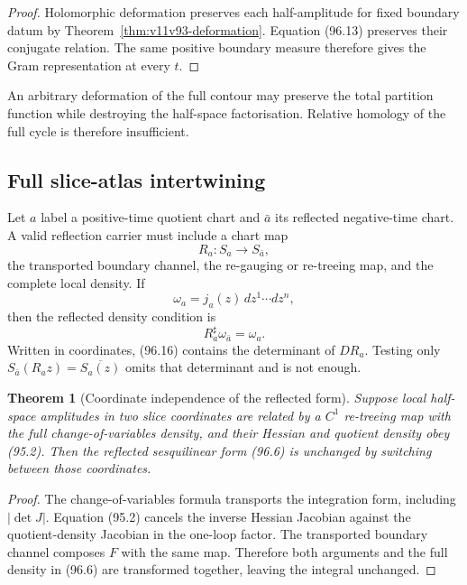 \documentclass[11pt]{article}
\newtheorem{theorem}{Theorem}[section]
\begin{document}
\begin{proof}
Holomorphic deformation preserves each half-amplitude for fixed
boundary datum by Theorem~\ref{thm:v11v93-deformation}.
Equation (96.13) preserves their conjugate relation.  The same
positive boundary measure therefore gives the Gram representation at
every \(t\).
\end{proof}

An arbitrary deformation of the full contour may preserve the total
partition function while destroying the half-space factorisation.
Relative homology of the full cycle is therefore insufficient.

\subsection{Full slice-atlas intertwining}

Let \(a\) label a positive-time quotient chart and
\(\bar a\) its reflected negative-time chart.  A valid reflection
carrier must include a chart map
\[
             R_a:S_a\longrightarrow S_{\bar a},             \tag{96.14}
\]
the transported boundary channel, the re-gauging or re-treeing map,
and the complete local density.  If
\[
             \omega_a=j_a(z)\,dz^1\cdots dz^n,              \tag{96.15}
\]
then the reflected density condition is
\[
                         R_a^\sharp\omega_{\bar a}=\omega_a. \tag{96.16}
\]
Written in coordinates, (96.16) contains the determinant of
\(DR_a\).  Testing only
\(S_{\bar a}(R_az)=\overline{S_a(z)}\) omits that determinant and is
not enough.

\begin{theorem}[Coordinate independence of the reflected form]
\label{thm:v11v96-coordinate}
Suppose local half-space amplitudes in two slice coordinates are
related by a \(C^1\) re-treeing map with the full change-of-variables
density, and their Hessian and quotient density obey (95.2).
Then the reflected sesquilinear form (96.6) is unchanged by switching
between those coordinates.
\end{theorem}

\begin{proof}
The change-of-variables formula transports the integration form,
including \(|\det J|\).  Equation (95.2) cancels the inverse Hessian
Jacobian against the quotient-density Jacobian in the one-loop
factor.  The transported boundary channel composes \(F\) with the
same map.  Therefore both arguments and the full density in (96.6)
are transformed together, leaving the integral unchanged.
\end{proof}
\end{document}
